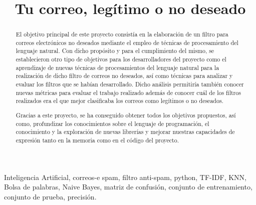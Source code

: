 \documentclass[conference,a4paper]{IEEEtran}
\begin{document}
\title{Tu correo, legítimo o no deseado}

\author{
  
  \and
  
}

\maketitle


\begin{abstract}
  El objetivo principal de este proyecto consistía en la elaboración de un filtro para correos electrónicos no deseados mediante el empleo de técnicas de procesamiento del lenguaje natural. Con dicho propósito y para el cumplimiento del mismo, se establecieron otro tipo de objetivos para los desarrolladores del proyecto como el aprendizaje de nuevas técnicas de procesamientos del lenguaje natural para la realización de dicho filtro de correos no deseados, así como técnicas para analizar y evaluar los filtros que se habían desarrollado. Dicho análisis permitiría también conocer nuevas métricas para evaluar el trabajo realizado además de conocer cuál de los filtros realizados era el que mejor clasificaba los correos como legítimos o no deseados.
  
Gracias a este proyecto, se ha conseguido obtener todos los objetivos propuestos, así como, profundizar los conocimientos sobre el lenguaje de programación, el conocimiento y la exploración de nuevas librerías y mejorar nuestras capacidades de expresión tanto en la memoria como en el código del proyecto.
\end{abstract}


\begin{IEEEkeywords}
  Inteligencia Artificial, correos-e spam, filtro anti-spam, python, TF-IDF, KNN, Bolsa de palabras, Naive Bayes, matriz de confusión, conjunto de entrenamiento, conjunto de prueba, precisión. 
\end{IEEEkeywords}
\end{document}
